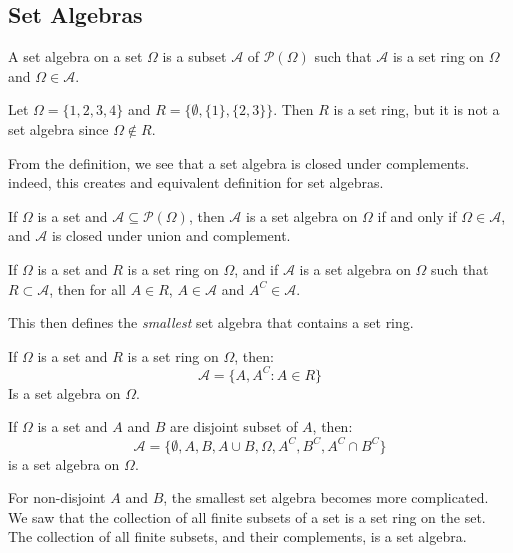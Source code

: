 \documentclass[crop=false,class=book,oneside]{standalone}
\begin{document}
        \subsection{Set Algebras}
            \begin{definition}
                A set algebra on a set $\Omega$ is a subset
                $\mathcal{A}$ of $\mathcal{P}(\Omega)$ such that
                $\mathcal{A}$ is a set ring on $\Omega$ and
                $\Omega\in\mathcal{A}$.
            \end{definition}
            \begin{example}
                Let $\Omega=\{1,2,3,4\}$ and
                $R=\{\emptyset,\{1\},\{2,3\}\}$. Then $R$
                is a set ring, but it is not a set algebra
                since $\Omega\notin{R}$.
            \end{example}
            From the definition, we see that a set algebra
            is closed under complements. indeed, this creates
            and equivalent definition for set algebras.
            \begin{theorem}
                If $\Omega$ is a set and
                $\mathcal{A}\subseteq\mathcal{P}(\Omega)$,
                then $\mathcal{A}$ is a set algebra on $\Omega$
                if and only if $\Omega\in\mathcal{A}$, and
                $\mathcal{A}$ is closed under union and
                complement.
            \end{theorem}
            \begin{theorem}
                If $\Omega$ is a set and $R$ is a set ring
                on $\Omega$, and if $\mathcal{A}$ is a set
                algebra on $\Omega$ such that
                $R\subset\mathcal{A}$, then for all $A\in{R}$,
                $A\in\mathcal{A}$ and $A^{C}\in\mathcal{A}$.
            \end{theorem}
            This then defines the \textit{smallest} set algebra
            that contains a set ring.
            \begin{theorem}
                If $\Omega$ is a set and $R$ is a set ring on
                $\Omega$, then:
                \begin{equation}
                    \mathcal{A}=\{A,A^{C}:A\in{R}\}
                \end{equation}
                Is a set algebra on $\Omega$.
            \end{theorem}
            \begin{theorem}
                If $\Omega$ is a set and $A$ and $B$ are
                disjoint subset of $A$, then:
                \begin{equation}
                    \mathcal{A}=
                        \{\emptyset,A,B,A\cup{B},
                          \Omega,A^{C},B^{C},A^{C}\cap{B}^{C}\}
                \end{equation}
                is a set algebra on $\Omega$.
            \end{theorem}
            For non-disjoint $A$ and $B$, the smallest
            set algebra becomes more complicated. We saw that
            the collection of all finite subsets of a set is
            a set ring on the set. The collection of all finite
            subsets, and their complements, is a set algebra.
\end{document}
